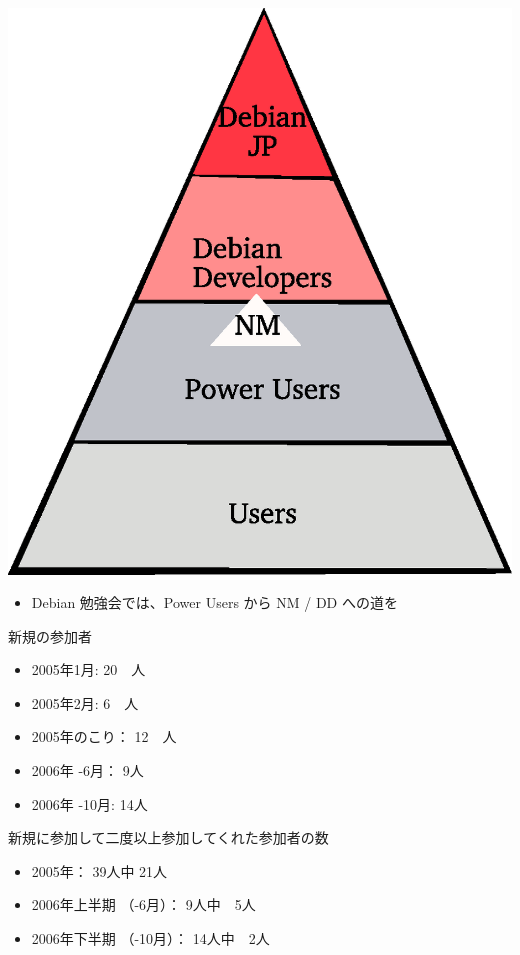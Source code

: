 \documentclass[cjk,dvipdfmx]{beamer}
\begin{document}
\begin{frame}

\begin{minipage}{0.6\hsize}
 \includegraphics[width=0.5\hsize]{image200612/hierarchy.eps}
\end{minipage}
\begin{minipage}{0.6\hsize}
 \begin{itemize}
  \item Debian 勉強会では、Power Users から NM / DD への道を
 \end{itemize}
\end{minipage}
\end{frame}


\begin{frame}{新規の参加者}

\begin{itemize}
 \item 2005年1月: 20　人
 \item 2005年2月: 6　人
 \item 2005年のこり： 12　人
 \item 2006年 -6月： 9人
 \item 2006年 -10月: 14人
\end{itemize}

\end{frame}

\begin{frame}{新規に参加して二度以上参加してくれた参加者の数}
 
\begin{itemize}
 \item 2005年： 39人中 21人
 \item 2006年上半期 （-6月）： 9人中　5人
 \item 2006年下半期 （-10月）： 14人中　2人
\end{itemize}

\end{frame}
\end{document}
